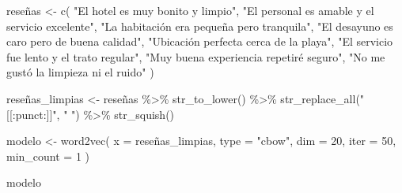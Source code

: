 \documentclass[
  letterpaper,
  DIV=11,
  numbers=noendperiod]{scrreprt}
\newenvironment{Shaded}{\begin{snugshade}}{\end{snugshade}}
\newcommand{\AttributeTok}[1]{\textcolor[rgb]{0.40,0.45,0.13}{#1}}
\newcommand{\DecValTok}[1]{\textcolor[rgb]{0.68,0.00,0.00}{#1}}
\newcommand{\FunctionTok}[1]{\textcolor[rgb]{0.28,0.35,0.67}{#1}}
\newcommand{\NormalTok}[1]{\textcolor[rgb]{0.00,0.23,0.31}{#1}}
\newcommand{\OtherTok}[1]{\textcolor[rgb]{0.00,0.23,0.31}{#1}}
\newcommand{\SpecialCharTok}[1]{\textcolor[rgb]{0.37,0.37,0.37}{#1}}
\newcommand{\StringTok}[1]{\textcolor[rgb]{0.13,0.47,0.30}{#1}}
\begin{document}
\begin{Shaded}
\begin{Highlighting}[]
\NormalTok{reseñas }\OtherTok{\textless{}{-}} \FunctionTok{c}\NormalTok{(}
  \StringTok{"El hotel es muy bonito y limpio"}\NormalTok{,}
  \StringTok{"El personal es amable y el servicio excelente"}\NormalTok{,}
  \StringTok{"La habitación era pequeña pero tranquila"}\NormalTok{,}
  \StringTok{"El desayuno es caro pero de buena calidad"}\NormalTok{,}
  \StringTok{"Ubicación perfecta cerca de la playa"}\NormalTok{,}
  \StringTok{"El servicio fue lento y el trato regular"}\NormalTok{,}
  \StringTok{"Muy buena experiencia repetiré seguro"}\NormalTok{,}
  \StringTok{"No me gustó la limpieza ni el ruido"}
\NormalTok{)}

\NormalTok{reseñas\_limpias }\OtherTok{\textless{}{-}}\NormalTok{ reseñas }\SpecialCharTok{\%\textgreater{}\%}
  \FunctionTok{str\_to\_lower}\NormalTok{() }\SpecialCharTok{\%\textgreater{}\%}
  \FunctionTok{str\_replace\_all}\NormalTok{(}\StringTok{"[[:punct:]]"}\NormalTok{, }\StringTok{" "}\NormalTok{) }\SpecialCharTok{\%\textgreater{}\%}
  \FunctionTok{str\_squish}\NormalTok{()}

\NormalTok{modelo }\OtherTok{\textless{}{-}} \FunctionTok{word2vec}\NormalTok{(}
  \AttributeTok{x =}\NormalTok{ reseñas\_limpias,}
  \AttributeTok{type =} \StringTok{"cbow"}\NormalTok{,}
  \AttributeTok{dim =} \DecValTok{20}\NormalTok{,}
  \AttributeTok{iter =} \DecValTok{50}\NormalTok{,}
  \AttributeTok{min\_count =} \DecValTok{1}
\NormalTok{)}

\NormalTok{modelo}
\end{Highlighting}
\end{Shaded}
\end{document}
